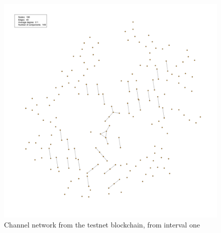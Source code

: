 \begin{figure}[H]
    \centering
    \includegraphics[width=14cm]{figures/graphs/cg_bc_testnet_run1.png}
    \caption{Channel network from the testnet blockchain, from interval one}
    \label{fig:channel_network_BC_testnet}
\end{figure}
